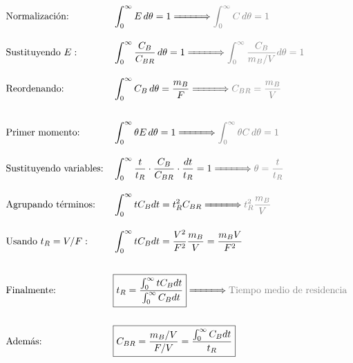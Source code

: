 \begin{alignat*}{2}
     & \text{Normalización:}          &  & \int_{0}^{\infty} E \, d\theta = 1 \xLongrightarrow{\hspace{1cm}} \textcolor{gray}{\int_{0}^{\infty} C \, d\theta = 1}                                       \\[10pt]
     & \text{Sustituyendo } E:        &  & \int_{0}^{\infty} \frac{C_B}{C_{BR}} \, d\theta = 1 \xLongrightarrow{\hspace{1cm}} \textcolor{gray}{\int_{0}^{\infty} \frac{C_B}{m_B/V} d\theta = 1}         \\[10pt]
     & \text{Reordenando:}            &  & \int_{0}^{\infty} C_B \, d\theta = \frac{m_B}{F} \xLongrightarrow{\hspace{1cm}} \textcolor{gray}{C_{BR} = \frac{m_B}{V}}                                     \\[18pt]
     & \text{Primer momento:}         &  & \int_{0}^{\infty} \theta E \, d\theta = 1 \xLongrightarrow{\hspace{1cm}} \textcolor{gray}{\int_{0}^{\infty} \theta C \, d\theta = 1}                         \\[10pt]
     & \text{Sustituyendo variables:} &  & \int_{0}^{\infty} \frac{t}{t_R} \cdot \frac{C_B}{C_{BR}} \cdot \frac{dt}{t_R} = 1 \xLongrightarrow{\hspace{1cm}} \textcolor{gray}{\theta = \frac{t}{t_R}}    \\[10pt]
     & \text{Agrupando términos:}     &  & \int_{0}^{\infty} t C_B dt = t_R^2 C_{BR} \xLongrightarrow{\hspace{1cm}} \textcolor{gray}{t_R^2 \frac{m_B}{V}}                                               \\[10pt]
     & \text{Usando } t_R = V/F:      &  & \int_{0}^{\infty} t C_B dt = \frac{V^2}{F^2} \frac{m_B}{V} = \frac{m_B V}{F^2}                                                                               \\[18pt]
     & \text{Finalmente:}             &  & \boxed{t_R = \frac{\int_{0}^{\infty} t C_B dt}{\int_{0}^{\infty} C_B dt}} \xLongrightarrow{\hspace{1cm}} \textcolor{gray}{\text{Tiempo medio de residencia}} \\[15pt]
     & \text{Además:}                 &  & \boxed{C_{BR} = \frac{m_B/V}{F/V} = \frac{\int_{0}^{\infty} C_B dt}{t_R}}
\end{alignat*}
